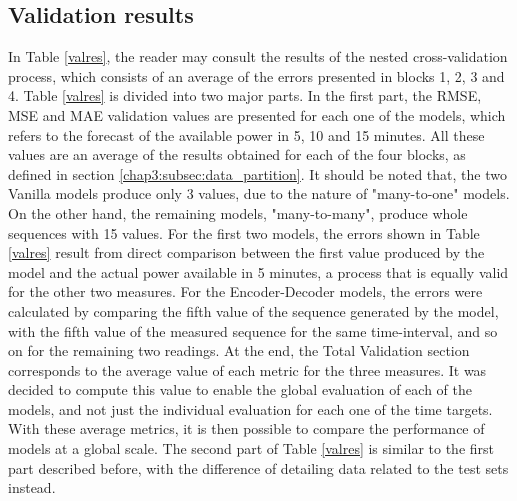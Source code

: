 \subsection{Validation results}

In Table \ref{valres}, the reader may consult the results of the nested cross-validation process, which consists of an average of the errors presented in blocks 1, 2, 3 and 4. Table \ref{valres} is divided into two major parts. In the first part, the \ac{RMSE}, \ac{MSE} and \ac{MAE} validation values are presented for each one of the models, which refers to the forecast of the available power in 5, 10 and 15 minutes. All these values are an average of the results obtained for each of the four blocks, as defined in section \ref{chap3:subsec:data_partition}. It should be noted that, the two Vanilla models produce only 3 values, due to the nature of "many-to-one" models. On the other hand, the remaining models, "many-to-many", produce whole sequences with 15 values. For the first two models, the errors shown in Table \ref{valres} result from direct comparison between the first value produced by the model and the actual power available in 5 minutes, a process that is equally valid for the other two measures. For the Encoder-Decoder models, the errors were calculated by comparing the fifth value of the sequence generated by the model, with the fifth value of the measured sequence for the same time-interval, and so on for the remaining two readings. At the end, the Total Validation section corresponds to the average value of each metric for the three measures. It was decided to compute this value to enable the global evaluation of each of the models, and not just the individual evaluation for each one of the time targets. With these average metrics, it is then possible to compare the performance of models at a global scale. The second part of Table \ref{valres} is similar to the first part described before, with the difference of detailing data related to the test sets instead.

